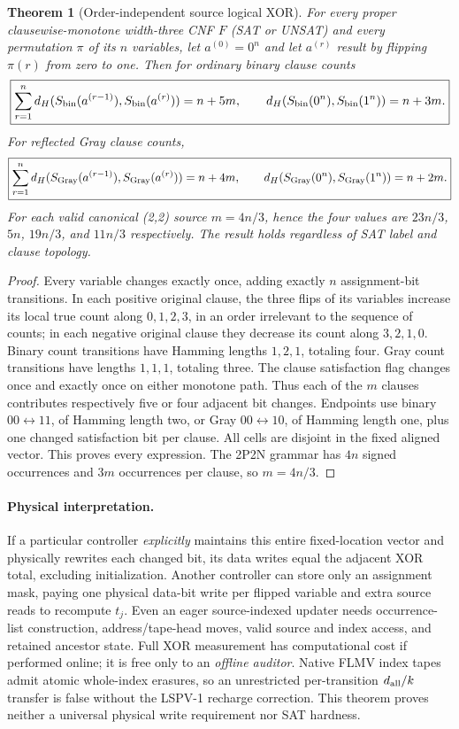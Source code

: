 \documentclass[11pt]{article}
\newtheorem{theorem}{Theorem}
\begin{document}
\begin{theorem}[Order-independent source logical XOR]
For every proper clausewise-monotone width-three CNF $F$ (SAT or UNSAT) and every permutation $\pi$ of its $n$ variables, let $a^{(0)}=0^n$ and let $a^{(r)}$ result by flipping $\pi(r)$ from zero to one. Then for ordinary binary clause counts
\[
 \boxed{\sum_{r=1}^{n}d_H(S_{\rm bin}(a^{(r-1)}),S_{\rm bin}(a^{(r)}))=n+5m,\qquad
 d_H(S_{\rm bin}(0^n),S_{\rm bin}(1^n))=n+3m.}
\]
For reflected Gray clause counts,
\[
 \boxed{\sum_{r=1}^{n}d_H(S_{\rm Gray}(a^{(r-1)}),S_{\rm Gray}(a^{(r)}))=n+4m,\qquad
 d_H(S_{\rm Gray}(0^n),S_{\rm Gray}(1^n))=n+2m.}
\]
For each valid canonical (2,2) source $m=4n/3$, hence the four values are $23n/3$, $5n$, $19n/3$, and $11n/3$ respectively. The result holds regardless of SAT label and clause topology.
\end{theorem}
\begin{proof}
Every variable changes exactly once, adding exactly $n$ assignment-bit transitions. In each positive original clause, the three flips of its variables increase its local true count along $0,1,2,3$, in an order irrelevant to the sequence of counts; in each negative original clause they decrease its count along $3,2,1,0$. Binary count transitions have Hamming lengths $1,2,1$, totaling four. Gray count transitions have lengths $1,1,1$, totaling three. The clause satisfaction flag changes once and exactly once on either monotone path. Thus each of the $m$ clauses contributes respectively five or four adjacent bit changes. Endpoints use binary $00\leftrightarrow11$, of Hamming length two, or Gray $00\leftrightarrow10$, of Hamming length one, plus one changed satisfaction bit per clause. All cells are disjoint in the fixed aligned vector. This proves every expression. The 2P2N grammar has $4n$ signed occurrences and $3m$ occurrences per clause, so $m=4n/3$.
\end{proof}
\paragraph{Physical interpretation.} If a particular controller \emph{explicitly} maintains this entire fixed-location vector and physically rewrites each changed bit, its data writes equal the adjacent XOR total, excluding initialization. Another controller can store only an assignment mask, paying one physical data-bit write per flipped variable and extra source reads to recompute $t_j$. Even an eager source-indexed updater needs occurrence-list construction, address/tape-head moves, valid source and index access, and retained ancestor state. Full XOR measurement has computational cost if performed online; it is free only to an \emph{offline auditor}. Native FLMV index tapes admit atomic whole-index erasures, so an unrestricted per-transition $d_{\rm all}/k$ transfer is false without the LSPV-1 recharge correction. This theorem proves neither a universal physical write requirement nor SAT hardness.
\end{document}
